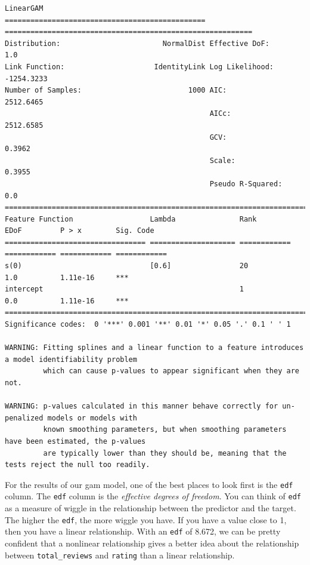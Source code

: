 \documentclass[
  letterpaper,
]{krantz}
\begin{document}
\begin{verbatim}
LinearGAM                                                                                                 
=============================================== ==========================================================
Distribution:                        NormalDist Effective DoF:                                         1.0
Link Function:                     IdentityLink Log Likelihood:                                 -1254.3233
Number of Samples:                         1000 AIC:                                             2512.6465
                                                AICc:                                            2512.6585
                                                GCV:                                                0.3962
                                                Scale:                                              0.3955
                                                Pseudo R-Squared:                                      0.0
==========================================================================================================
Feature Function                  Lambda               Rank         EDoF         P > x        Sig. Code   
================================= ==================== ============ ============ ============ ============
s(0)                              [0.6]                20           1.0          1.11e-16     ***         
intercept                                              1            0.0          1.11e-16     ***         
==========================================================================================================
Significance codes:  0 '***' 0.001 '**' 0.01 '*' 0.05 '.' 0.1 ' ' 1

WARNING: Fitting splines and a linear function to a feature introduces a model identifiability problem
         which can cause p-values to appear significant when they are not.

WARNING: p-values calculated in this manner behave correctly for un-penalized models or models with
         known smoothing parameters, but when smoothing parameters have been estimated, the p-values
         are typically lower than they should be, meaning that the tests reject the null too readily.
\end{verbatim}

For the results of our gam model, one of the best places to look first
is the \texttt{edf} column. The \texttt{edf} column is the
\emph{effective degrees of freedom}. You can think of \texttt{edf} as a
measure of wiggle in the relationship between the predictor and the
target. The higher the \texttt{edf}, the more wiggle you have. If you
have a value close to 1, then you have a linear relationship. With an
\texttt{edf} of 8.672, we can be pretty confident that a nonlinear
relationship gives a better idea about the relationship between
\texttt{total\_reviews} and \texttt{rating} than a linear relationship.
\end{document}
